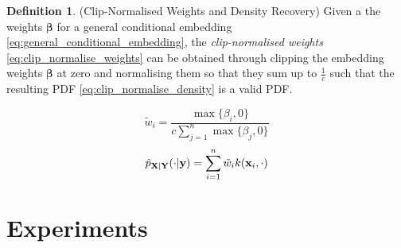 \documentclass[twoside]{article} \usepackage{aistats2017}
\theoremstyle{definition}
\newtheorem{definition}{Definition}[section]
\theoremstyle{theorem}
\begin{document}
		\begin{definition} \label{def:clip_normalise}
		(Clip-Normalised Weights and Density Recovery)
		Given a the weights $\bm{\beta}$ for a general conditional embedding \eqref{eq:general_conditional_embedding}, the \textit{clip-normalised weights} \eqref{eq:clip_normalise_weights} can be obtained through clipping the embedding weights $\bm{\beta}$ at zero and normalising them so that they sum up to $\frac{1}{c}$ such that the resulting PDF \eqref{eq:clip_normalise_density} is a valid PDF.

			\begin{equation}
				\tilde{w}_{i} = \frac{\max\{\beta_{i}, 0\}}{c \sum_{j = 1}^{n} \max\{\beta_{j}, 0\}}
			\label{eq:clip_normalise_weights}
			\end{equation}
			\begin{equation}
				\hat{p}_{\mathbf{X} | \mathbf{Y}}(\cdot | \mathbf{y}) = \sum_{i = 1}^{n} \tilde{w}_{i} k(\mathbf{x}_{i}, \cdot)
			\label{eq:clip_normalise_density}
			\end{equation}
		\end{definition}
			
\section{Experiments}
\label{sec:experiments}
\end{document}
